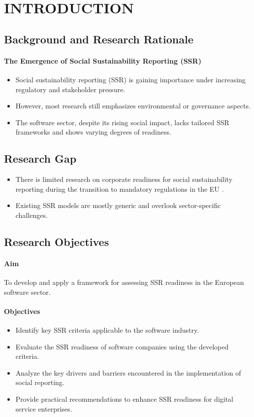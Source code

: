 \chapter{INTRODUCTION}

\section{Background and Research Rationale}

\subsubsection{The Emergence of Social Sustainability Reporting (SSR)}
\begin{itemize}
    \item Social sustainability reporting (SSR) 
    is gaining importance under increasing regulatory and stakeholder pressure.
    \item However, most research still emphasizes environmental or governance aspects. 
    \item The software sector, despite its rising social impact, lacks tailored SSR frameworks and shows varying degrees of readiness.
\end{itemize}

\section{Research Gap}
\begin{itemize}
    \item There is limited research on corporate readiness for social 
    sustainability reporting during the transition to mandatory 
    regulations in the EU \parencite{Fiechter2022}.
    \item Existing SSR models are mostly generic and overlook sector-specific challenges.
\end{itemize}

\section{Research Objectives}
\subsubsection{Aim}
To develop and apply a framework 
for assessing SSR readiness in the European software sector.

\subsubsection{Objectives}
\begin{itemize}
    \item Identify key SSR criteria applicable to the software industry.
    \item Evaluate the SSR readiness of software companies using the developed criteria.
    \item Analyze the key drivers and barriers encountered in the implementation of social reporting.
    \item Provide practical recommendations to enhance SSR readiness for digital service enterprises.
\end{itemize}

